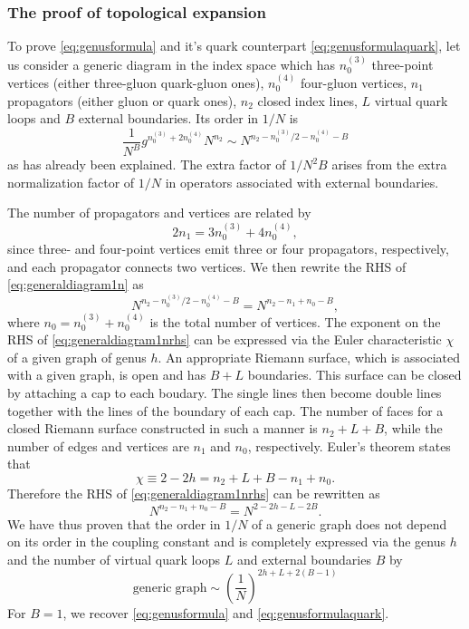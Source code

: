 \subsubsection{The proof of topological expansion}
To prove \eqref{eq:genusformula} and it's quark counterpart
\eqref{eq:genusformulaquark}, let us consider a generic diagram in the index
space which has $n_0^{(3)}$ three-point vertices (either three-gluon
quark-gluon ones), $n_0^{(4)}$ four-gluon vertices, $n_1$ propagators (either
gluon or quark ones), $n_2$ closed index lines, $L$ virtual quark loops
and $B$ external boundaries. Its order in $1/N$ is
\begin{equation}
  \frac{1}{N^B}g^{n_0^{(3)}+2n_0^{(4)}}N^{n_2}\sim N^{n_2 - n_0^{(3)}/2
  - n_0^{(4)} - B}
  \label{eq:generaldiagram1n}
\end{equation}
as has already been explained. The extra factor of $1/N^2B$ arises from
the extra normalization factor of $1/N$ in operators associated with external
boundaries.
\par The number of propagators and vertices are related by
\begin{equation}
  2n_1 = 3n_0^{(3)} + 4n_0^{(4)},
\end{equation}
since three- and four-point vertices emit three or four propagators,
respectively, and each propagator connects two vertices. We then rewrite
the RHS of \eqref{eq:generaldiagram1n} as
\begin{equation}
  N^{n_2 - n_0^{(3)}/2 -n_0^{(4)} - B} = N^{n_2 - n_1 + n_0 -B},
  \label{eq:generaldiagram1nrhs}
\end{equation}
where $n_0 = n_0^{(3)} + n_0^{(4)} $ is the total number of vertices.
The exponent on the RHS of \eqref{eq:generaldiagram1nrhs} can be expressed
via the Euler characteristic $\chi$ of a given graph of genus $h$. An
appropriate Riemann surface, which is associated with a given graph,
is open and has $B+L$ boundaries. This surface can be closed by attaching
a cap to each boudary. The single lines then become double lines 
together with the lines  of the boundary of each cap. The number of faces for
a closed Riemann surface constructed in such a manner is $n_2+L+B$, while
the number of edges and vertices are $n_1$ and $n_0$, respectively. Euler's
theorem states that
\begin{equation}
\chi \equiv 2- 2h = n_2 + L + B -n_1+n_0.
\end{equation}
Therefore the RHS of \eqref{eq:generaldiagram1nrhs} can be rewritten as
\begin{equation}
  N^{n_2-n_1+n_0-B} = N^{2-2h-L-2B}.
\end{equation}
We have thus proven that the order in $1/N$ of a generic graph does
not depend on its order in the coupling constant and is completely 
expressed via the genus $h$ and the number of virtual quark loops $L$ and 
external boundaries $B$ by
\begin{equation}
  \mathrm{generic\;graph}\sim\left(\frac{1}{N}\right)^{2h+L+2(B-1)}
  \label{eq:genericgenusformula}  
\end{equation}
For $B=1$, we recover \eqref{eq:genusformula} and
\eqref{eq:genusformulaquark}.

